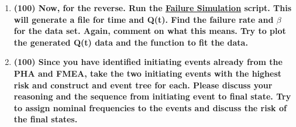 \documentclass[11pt,a4paper]{article}
\begin{document}
\begin{enumerate}[leftmargin=*,topsep=0pt,font=\bfseries]
        
        
        
        
        
        
        
        
        
        
        
        
        
        
        
        
        
        
        
        
        
        
        
        
        
        
        
        
        
        
        
        \newpage
    \item\textbf{(100) Now, for the reverse. Run the \href{https://github.com/TheDoctorRAB/education/tree/master/src}{Failure Simulation} script. This will generate a file for time and Q(t). Find the failure rate and $\beta$ for the data set. Again, comment on what this means. Try to plot the generated Q(t) data and the function to fit the data.}
        \vspace{\baselineskip}


























        \newpage
    \item\textbf{(100) Since you have identified initiating events already from the PHA and FMEA, take the two initiating events with the highest risk and construct and event tree for each. Please discuss your reasoning and the sequence from initiating event to final state.  Try to assign nominal frequencies to the events and discuss the risk of the final states.}
        \vspace{\baselineskip}
        
        
        
        
        
        
        

\end{enumerate}
\end{document}
